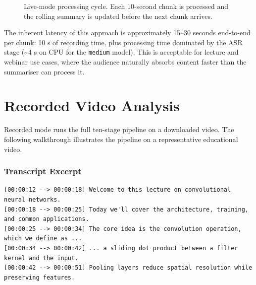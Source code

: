 \documentclass[12pt,a4paper]{article}
\begin{document}
\begin{figure}[H]
\centering
{}
\caption{Live-mode processing cycle. Each 10-second chunk is processed and the rolling
summary is updated before the next chunk arrives.}
\label{fig:live}
\end{figure}

The inherent latency of this approach is approximately 15--30 seconds end-to-end per
chunk: 10 s of recording time, plus processing time dominated by the ASR stage
(\textasciitilde4 s on CPU for the \texttt{medium} model). This is acceptable for
lecture and webinar use cases, where the audience naturally absorbs content faster than
the summariser can process it.

\section{Recorded Video Analysis}
\label{sec:recorded}

Recorded mode runs the full ten-stage pipeline on a downloaded video. The following
walkthrough illustrates the pipeline on a representative educational video.

\subsubsection*{Transcript Excerpt}
\begin{lstlisting}[style=plain, caption={First five aligned transcript segments.}]
[00:00:12 --> 00:00:18] Welcome to this lecture on convolutional neural networks.
[00:00:18 --> 00:00:25] Today we'll cover the architecture, training, and common applications.
[00:00:25 --> 00:00:34] The core idea is the convolution operation, which we define as ...
[00:00:34 --> 00:00:42] ... a sliding dot product between a filter kernel and the input.
[00:00:42 --> 00:00:51] Pooling layers reduce spatial resolution while preserving features.
\end{lstlisting}
\end{document}
